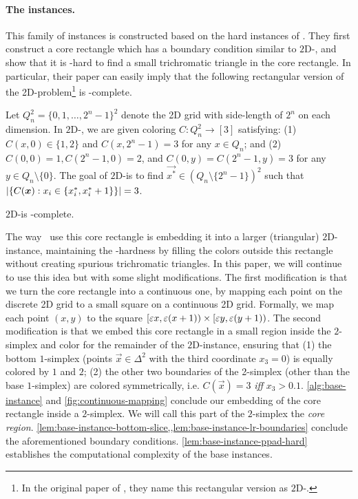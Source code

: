 \paragraph{The instances.} This family of instances is constructed based on the hard instances of \textcite{DBLP:journals/tcs/ChenD09}.
They first construct a core rectangle which has a  boundary condition similar to $2$D-\Sperner, and show that it is \PPAD-hard to find a small trichromatic triangle in the core rectangle. 
In particular, their paper can easily imply that the following rectangular version of the 2D-\Sperner problem\footnote{In the original paper of \textcite{DBLP:journals/tcs/ChenD09}, they name this rectangular version as $2$D-\Brouwer.} is \PPAD-complete. 
\begin{definition}
    \label{def:rect-sperner}
    Let $Q^2_n = \{0,1,\dots,2^n-1\}^2$ denote the 2D grid with side-length of $2^n$ on each dimension. 
    In $2${\rm D}-\rect\Sperner, we are given coloring $C:Q^2_n \to [3]$ satisfying: (1) $C(x,0)\in \{1,2\}$ and $C(x,2^{n}-1)=3$ for any $x\in Q_n$; and (2) $C(0,0)=1, C(2^n-1,0)=2$, and $C(0,y)=C(2^{n}-1,y)=3$ for any $y\in Q_n\setminus \{0\}$. 
    The goal of $2${\rm D}-\rect\Sperner is to find $\vec{x^*}\in ( Q_{n}\setminus \{2^n-1\}  )^2$ such that $|\{{C(\boldsymbol{x}): x_i \in \{{x_{i}^*,x_{i}^*+1} \} } \}|=3$.
\end{definition}

\begin{theorem}
    $2${\rm D}-\rect\Sperner is \PPAD-complete.
\end{theorem}
The way~\textcite{DBLP:journals/tcs/ChenD09} use this core rectangle is embedding it into a larger (triangular) $2${\rm D}-\Sperner instance, maintaining the \PPAD-hardness by filling the colors outside this rectangle without creating spurious trichromatic triangles. 
In this paper, we will continue to use this idea but with some slight modifications.
The first modification is that we turn the core rectangle into a continuous one, by mapping each point on the discrete 2D grid to a small square on a continuous 2D grid.
Formally, we map each point $(x,y)$ to the square $[\varepsilon x, \varepsilon(x+1))\times [\varepsilon y,\varepsilon (y+1))$. 
The second modification 
is that we embed this core rectangle in a small region 
inside the $2$-simplex and color for the remainder of the $2${\rm D}-\Sperner instance, ensuring that (1) the bottom $1$-simplex (points $\vec{x}\in \Delta^2$ with the third coordinate $x_3=0$) is equally colored by $1$ and $2$; 
(2) the other two boundaries of the 2-simplex (other than the base $1$-simplex) are colored symmetrically, i.e. $C(\vec{x})=3$ {\em iff} $x_3>0.1$.
\cref{alg:base-instance} and \cref{fig:continuous-mapping} conclude our embedding of the core rectangle inside a $2$-simplex.
We will call this part of the $2$-simplex the {\em core region}. 
\cref{lem:base-instance-bottom-slice,,lem:base-instance-lr-boundaries} conclude the aforementioned boundary conditions.
\cref{lem:base-instance-ppad-hard} establishes the computational complexity of the base instances. 

